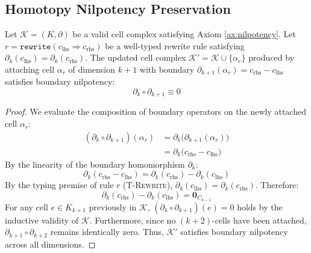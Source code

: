 \subsection{Homotopy Nilpotency Preservation}
\begin{lemma}
\label{lem:nilpotency_preservation}
Let $\mathcal{K} = (K, \partial)$ be a valid cell complex satisfying Axiom \ref{ax:nilpotency}. Let $r = \texttt{rewrite}(c_{\text{lhs}} \Rightarrow c_{\text{rhs}})$ be a well-typed rewrite rule satisfying $\partial_k(c_{\text{lhs}}) = \partial_k(c_{\text{rhs}})$. The updated cell complex $\mathcal{K}' = \mathcal{K} \cup \{\alpha_r\}$ produced by attaching cell $\alpha_r$ of dimension $k+1$ with boundary $\partial_{k+1}(\alpha_r) = c_{\text{rhs}} - c_{\text{lhs}}$ satisfies boundary nilpotency:
\begin{equation}
    \partial_k \circ \partial_{k+1} \equiv 0
\end{equation}
\end{lemma}

\begin{proof}
We evaluate the composition of boundary operators on the newly attached cell $\alpha_r$:
\begin{align}
    (\partial_k \circ \partial_{k+1})(\alpha_r) &= \partial_k\big( \partial_{k+1}(\alpha_r) \big) \\
    &= \partial_k\big( c_{\text{rhs}} - c_{\text{lhs}} \big)
\end{align}
By the linearity of the boundary homomorphism $\partial_k$:
\begin{equation}
    \partial_k(c_{\text{rhs}} - c_{\text{lhs}}) = \partial_k(c_{\text{rhs}}) - \partial_k(c_{\text{lhs}})
\end{equation}
By the typing premise of rule $r$ (\textsc{T-Rewrite}), $\partial_k(c_{\text{lhs}}) = \partial_k(c_{\text{rhs}})$. Therefore:
\begin{equation}
    \partial_k(c_{\text{rhs}}) - \partial_k(c_{\text{lhs}}) = \mathbf{0}_{C_{k-1}}
\end{equation}
For any cell $e \in K_{k+1}$ previously in $\mathcal{K}$, $(\partial_k \circ \partial_{k+1})(e) = 0$ holds by the inductive validity of $\mathcal{K}$. Furthermore, since no $(k+2)$-cells have been attached, $\partial_{k+1} \circ \partial_{k+2}$ remains identically zero. Thus, $\mathcal{K}'$ satisfies boundary nilpotency across all dimensions.
\end{proof}

